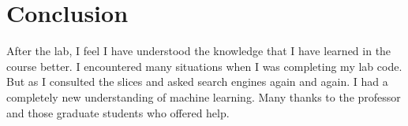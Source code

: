 \documentclass[journal, a4paper]{IEEEtran}
\begin{document}
\section{Conclusion}
	After the lab, I feel I have understood the knowledge that I have learned in the course better. I encountered many situations when I was completing my lab code. But as I consulted the slices and asked search engines again and again. I had a completely new understanding of machine learning. Many thanks to the professor and those graduate students who offered help.

\end{document}
